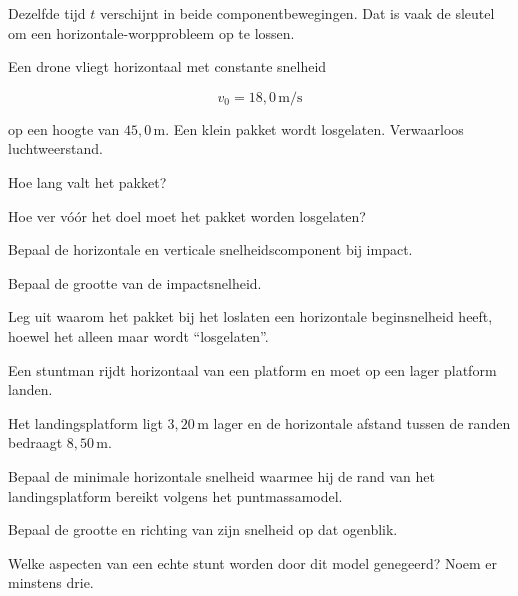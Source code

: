 \documentclass{ximera}
\begin{document}
\begin{eigenschap}

Dezelfde tijd $t$ verschijnt in beide componentbewegingen. Dat is vaak
de sleutel om een horizontale-worpprobleem op te lossen.

\end{eigenschap}


\begin{oefening}[Reddingspakket]{\oefU\ESS}

Een drone vliegt horizontaal met constante snelheid

\[
v_0=18,0\,\mathrm{m/s}
\]

op een hoogte van $45,0\,\mathrm{m}$. Een klein pakket wordt
losgelaten. Verwaarloos luchtweerstand.

\begin{question}
Hoe lang valt het pakket?
\end{question}

\begin{question}
Hoe ver vóór het doel moet het pakket worden losgelaten?
\end{question}

\begin{question}
Bepaal de horizontale en verticale snelheidscomponent bij impact.
\end{question}

\begin{question}
Bepaal de grootte van de impactsnelheid.
\end{question}

\begin{question}
Leg uit waarom het pakket bij het loslaten een horizontale
beginsnelheid heeft, hoewel het alleen maar wordt ``losgelaten''.
\end{question}

\end{oefening}


\begin{oefening}[Stuntman]{\oefG}

Een stuntman rijdt horizontaal van een platform en moet op een lager
platform landen.

Het landingsplatform ligt $3,20\,\mathrm{m}$ lager en de horizontale
afstand tussen de randen bedraagt $8,50\,\mathrm{m}$.

\begin{question}
Bepaal de minimale horizontale snelheid waarmee hij de rand van het
landingsplatform bereikt volgens het puntmassamodel.
\end{question}

\begin{question}
Bepaal de grootte en richting van zijn snelheid op dat ogenblik.
\end{question}

\begin{question}
Welke aspecten van een echte stunt worden door dit model genegeerd?
Noem er minstens drie.
\end{question}

\end{oefening}
\end{document}
